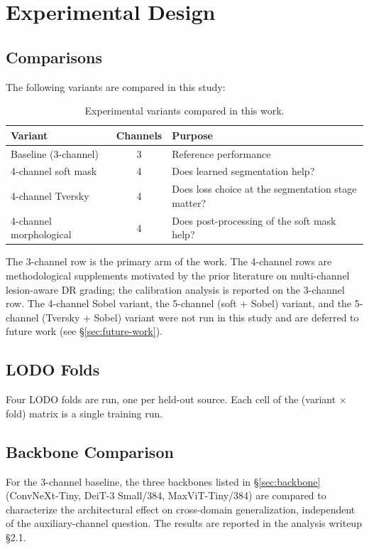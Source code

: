 \documentclass[11pt]{article}
\begin{document}
\section{Experimental Design}

\subsection{Comparisons}
The following variants are compared in this study:

\begin{table}[ht]
\centering
\begin{tabular}{lcl}
\toprule
Variant & Channels & Purpose \\
\midrule
Baseline (3-channel) & 3 & Reference performance \\
4-channel soft mask & 4 & Does learned segmentation help? \\
4-channel Tversky & 4 & Does loss choice at the segmentation stage matter? \\
4-channel morphological & 4 & Does post-processing of the soft mask help? \\
\bottomrule
\end{tabular}
\caption{Experimental variants compared in this work.}
\end{table}

The 3-channel row is the primary arm of the work. The 4-channel rows are methodological supplements motivated by the prior literature on multi-channel lesion-aware DR grading; the calibration analysis is reported on the 3-channel row. The 4-channel Sobel variant, the 5-channel (soft + Sobel) variant, and the 5-channel (Tversky + Sobel) variant were not run in this study and are deferred to future work (see \S\ref{sec:future-work}).

\subsection{LODO Folds}
Four LODO folds are run, one per held-out source. Each cell of the (variant $\times$ fold) matrix is a single training run.

\subsection{Backbone Comparison}
For the 3-channel baseline, the three backbones listed in \S\ref{sec:backbone} (ConvNeXt-Tiny, DeiT-3 Small/384, MaxViT-Tiny/384) are compared to characterize the architectural effect on cross-domain generalization, independent of the auxiliary-channel question. The results are reported in the analysis writeup \S2.1.
\end{document}
